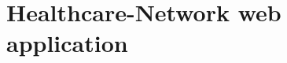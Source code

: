 \cite{glaser_surgeon_2019}
\cite{bonati_surgeon_2021}
\cite{renzulli_learning_2005}
\cite{renzulli_influence_2006}
\cite{read_surgeon_2002}
\cite{mcdermott_surgeon_2013}
\cite{yen_surgeon_2014}
\cite{nietz_quality_2020}

\section{Healthcare-Network web application}












